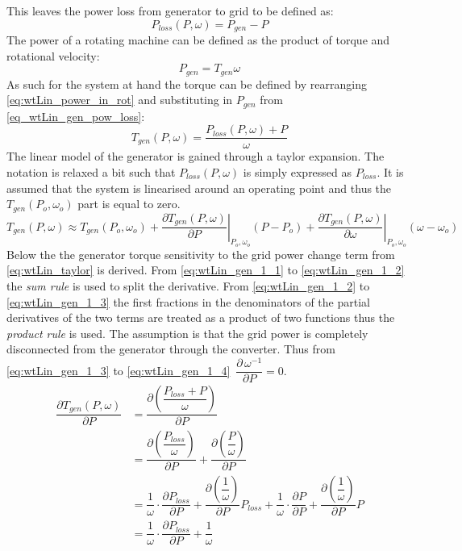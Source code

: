This leaves the power loss from generator to grid to be defined as:
\begin{equation} \label{eq_wtLin_gen_pow_loss}
	P_{loss}(P, \omega) = P_{gen} - P%
\end{equation}
The power of a rotating machine can be defined as the product of torque and rotational velocity:
\begin{equation}\label{eq:wtLin_power_in_rot}
	P_{gen} = T_{gen} \omega
\end{equation}
As such for the system at hand the torque can be defined by rearranging \cref{eq:wtLin_power_in_rot} and substituting in $ P_{gen} $ from \cref{eq_wtLin_gen_pow_loss}:
\begin{equation}\label{key}
	T_{gen}(P, \omega) = \dfrac{P_{loss}(P, \omega) + P}{\omega}
\end{equation}
The linear model of the generator is gained through a taylor expansion. The notation is relaxed a bit such that $ P_{loss}( P, \omega) $ is simply expressed as $ P_{loss} $. It is assumed that the system is linearised around an operating point and thus the $ T_{gen}(P_o, \omega_o) $ part is equal to zero.
\begin{equation}\label{eq:wtLin_taylor}
	T_{gen}( P, \omega) \approx T_{gen}(P_o, \omega_o) + 
	\left. \dfrac{\partial T_{gen}( P, \omega)}{\partial P} \right |_{P_o,\omega_o} ( P-P_o) + 
	\left. \dfrac{\partial T_{gen}( P, \omega)}{\partial \omega} \right |_{P_o,\omega_o} (\omega - \omega_o)
\end{equation}
Below the the generator torque sensitivity to the grid power change term from \cref{eq:wtLin_taylor} is derived. From \cref{eq:wtLin_gen_1_1} to \cref{eq:wtLin_gen_1_2} the \textit{sum rule} is used to split the derivative. From \cref{eq:wtLin_gen_1_2} to \cref{eq:wtLin_gen_1_3} the first fractions in the denominators of the partial derivatives of the two terms are treated as a product of two functions thus the \textit{product rule} is used. The assumption is that the grid power is completely disconnected from the generator through the converter. Thus from \cref{eq:wtLin_gen_1_3} to \cref{eq:wtLin_gen_1_4} $ \, \dfrac{\partial \, \omega^{-1}}{\partial P} = 0 $.
\begin{align} 
	\dfrac{\partial T_{gen}( P, \omega)}{\partial P} &= \dfrac{\partial \left (\dfrac{P_{loss} +  P}{\omega}\right )}{\partial P} \label{eq:wtLin_gen_1_1} \\
	& = \dfrac{\partial \left (\dfrac{P_{loss}}{\omega} \right )}{\partial P} + \dfrac{\partial \left ( \dfrac{ P}{\omega} \right )}{\partial P} \label{eq:wtLin_gen_1_2} \\
	& = \dfrac{1}{\omega} \cdot \dfrac{\partial P_{loss}}{\partial P} + \dfrac{\partial \left ( \dfrac{1}{\omega} \right )}{\partial P} P_{loss} + \dfrac{1}{\omega} \cdot \dfrac{\partial P}{\partial P} + \dfrac{\partial \left (\dfrac{1}{\omega} \right )}{\partial P}  P \label{eq:wtLin_gen_1_3} \\
	& = \dfrac{1}{\omega} \cdot \dfrac{\partial P_{loss}}{\partial P} + \dfrac{1}{\omega} \label{eq:wtLin_gen_1_4}
\end{align}


